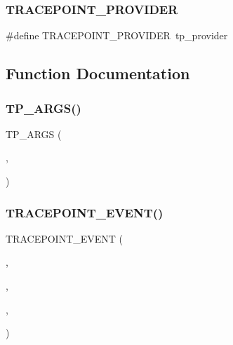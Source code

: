 \subsubsection{\texorpdfstring{T\+R\+A\+C\+E\+P\+O\+I\+N\+T\+\_\+\+P\+R\+O\+V\+I\+D\+ER}{TRACEPOINT\_PROVIDER}}
{\footnotesize\ttfamily \#define T\+R\+A\+C\+E\+P\+O\+I\+N\+T\+\_\+\+P\+R\+O\+V\+I\+D\+ER~tp\+\_\+provider}



\subsection{Function Documentation}
\mbox{\label{time-tp_8h_a94a7a81b68dcdbeece169da86213a640}} 
\subsubsection{\texorpdfstring{T\+P\+\_\+\+A\+R\+G\+S()}{TP\_ARGS()}}
{\footnotesize\ttfamily T\+P\+\_\+\+A\+R\+GS (\begin{DoxyParamCaption}\item[{int}]{,  }\item[{probe\+\_\+nr}]{ }\end{DoxyParamCaption})}

\mbox{\label{time-tp_8h_a2b7f574c00f7fe1cbd4b66ccca5e2fab}} 
\subsubsection{\texorpdfstring{T\+R\+A\+C\+E\+P\+O\+I\+N\+T\+\_\+\+E\+V\+E\+N\+T()}{TRACEPOINT\_EVENT()}}
{\footnotesize\ttfamily T\+R\+A\+C\+E\+P\+O\+I\+N\+T\+\_\+\+E\+V\+E\+NT (\begin{DoxyParamCaption}\item[{tp\+\_\+provider}]{,  }\item[{time\+\_\+tracepoint\+\_\+dummy\+\_\+old}]{,  }\item[{\hyperlink{time-tp_8h_a94a7a81b68dcdbeece169da86213a640}{T\+P\+\_\+\+A\+R\+GS}( int, probe\+\_\+nr)}]{,  }\item[{T\+P\+\_\+\+F\+I\+E\+L\+DS( ctf\+\_\+integer(int, probe\+Number, probe\+\_\+nr))}]{ }\end{DoxyParamCaption})}




